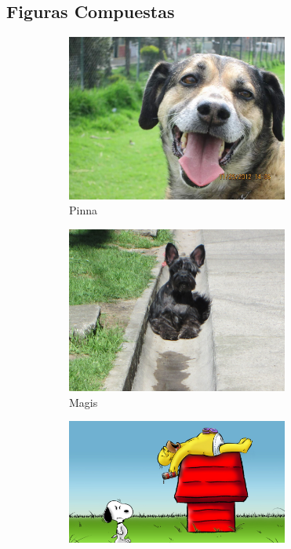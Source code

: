\documentclass{article}
\begin{document}
\begin{enumerate}
\begin{figure}[!h]
\end{figure}

\subsection{Figuras Compuestas}

\begin{figure}[h!]
	\begin{subfigure}{0.5\textwidth}
		\centering
		\includegraphics[width = 0.8\textwidth]{Imagenes/Pinina.jpg}
		\caption{Pinna}
		\label{Pinina2}		
	\end{subfigure}
	\begin{subfigure}{0.5\textwidth}
		\centering
		\includegraphics[width = 0.8\textwidth]{Imagenes/Magis.JPG}
		\caption{Magis}
		\label{Magis}		
	\end{subfigure}
	\begin{subfigure}{0.5\textwidth}
		\centering
		\includegraphics[width = 0.8\textwidth]{Imagenes/Homero.jpg}

\end{subfigure}
\end{figure}
\end{enumerate}
\end{document}
